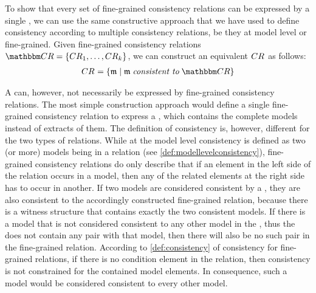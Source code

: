 To show that every set of fine-grained consistency relations can be expressed by a single \modellevelconsistencyrelation, we can use the same constructive approach that we have used to define consistency according to multiple consistency relations, be they at model level or fine-grained.
Given fine-grained consistency relations $\consistencyrelationset{CR} = \setted{\consistencyrelation{CR}{1}, \dots, \consistencyrelation{CR}{k}}$, we can construct an equivalent \modellevelconsistencyrelation $\consistencyrelation{CR}{}$ as follows:
\begin{align*}
    \consistencyrelation{CR}{} = \setted{\modeltuple{m} \mid \modeltuple{m} \consistenttomath \consistencyrelationset{CR}}
\end{align*}

A \modellevelconsistencyrelation can, however, not necessarily be expressed by fine-grained consistency relations.
The most simple construction approach would define a single fine-grained consistency relation to express a \modellevelconsistencyrelation, which contains the complete models instead of extracts of them.
The definition of consistency is, however, different for the two types of relations.
While at the model level consistency is defined as two (or more) models being in a relation (see \autoref{def:modellevelconsistency}), fine-grained consistency relations do only describe that if an element in the left side of the relation occurs in a model, then any of the related elements at the right side has to occur in another.
If two models are considered consistent by a \modellevelconsistencyrelation, they are also consistent to the accordingly constructed fine-grained relation, because there is a witness structure that contains exactly the two consistent models.
If there is a model that is not considered consistent to any other model in the \modellevelconsistencyrelation, thus the \modellevelconsistencyrelation does not contain any pair with that model, then there will also be no such pair in the fine-grained relation.
According to \autoref{def:consistency} of consistency for fine-grained relations, if there is no condition element in the relation, then consistency is not constrained for the contained model elements.
In consequence, such a model would be considered consistent to every other model.

